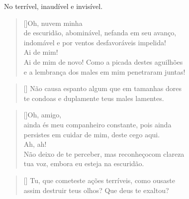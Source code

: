    No terrível, inaudível e invisível.


\settowidth{\versewidth}{brilhante? Tenso, agito-me com medo em meu trêm}
\begin{verse}[\versewidth]Oh, nuvem minha\\ 
de escuridão, abominável, nefanda em seu avanço,\\
indomável e por ventos desfavoráveis impelida!\\
Ai de mim!\\
Ai de mim de novo! Como a picada destes aguilhões\\
e a lembrança dos males em mim penetraram juntas!
\end{verse}



\settowidth{\versewidth}{Não causa espanto algum que em tamanhas dores}
\begin{verse}[\versewidth]
Não causa espanto algum que em tamanhas dores\\
te condoas e duplamente teus males lamentes.
\end{verse}




\settowidth{\versewidth}{ainda és meu companheiro constante, pois ainda}
\begin{verse}[\versewidth]Oh, amigo,\\ 
ainda és meu companheiro constante, pois ainda\\
persistes em cuidar de mim, deste cego aqui.\\
Ah, ah!\\
Não deixo de te perceber, mas reconheço\qb com clareza\\
tua voz, embora eu esteja na escuridão.
\end{verse}



\settowidth{\versewidth}{brilhante? Tenso, agito-me com medo em meu trêm}
\begin{verse}[\versewidth]
Tu, que cometeste ações terríveis, como ousaste\\
assim destruir teus olhos? Que deus te exaltou?
\end{verse}

